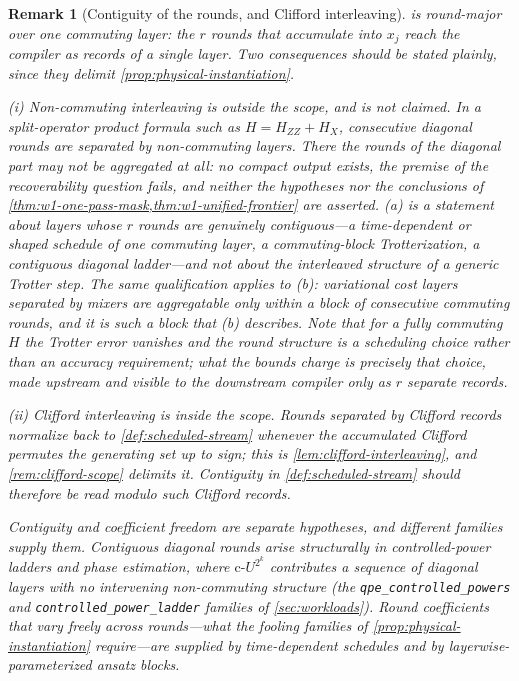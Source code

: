 \documentclass[aps,prx,reprint,floatfix,superscriptaddress]{revtex4-2}
\newtheorem{remark}{Remark}
\begin{document}
\begin{remark}[Contiguity of the rounds, and Clifford interleaving]
\label{rem:round-contiguity}
 is round-major over \emph{one} commuting
layer: the $r$ rounds that accumulate into $x_j$ reach the compiler as
records of a single layer.  Two consequences should be stated plainly,
since they delimit \cref{prop:physical-instantiation}.

(i) \emph{Non-commuting interleaving is outside the scope, and is not
claimed.}  In a split-operator product formula such as
$H=H_{ZZ}+H_X$, consecutive diagonal rounds are separated by
non-commuting layers.  There the rounds of the diagonal part may not be
aggregated at all: no compact output exists, the premise of the
recoverability question fails, and neither the hypotheses nor the
conclusions of \cref{thm:w1-one-pass-mask,thm:w1-unified-frontier}
are asserted.  (a) is a statement
about layers whose $r$ rounds are genuinely contiguous---a
time-dependent or shaped schedule of one commuting layer, a
commuting-block Trotterization, a contiguous diagonal ladder---and not
about the interleaved structure of a generic Trotter step.  The same
qualification applies to (b): variational cost layers separated by
mixers are aggregatable only within a block of consecutive commuting
rounds, and it is such a block that (b) describes.  Note that for a
\emph{fully} commuting $H$ the Trotter error vanishes and the round
structure is a scheduling choice rather than an accuracy requirement;
what the bounds charge is precisely that choice, made upstream and
visible to the downstream compiler only as $r$ separate records.

(ii) \emph{Clifford interleaving is inside the scope.}  Rounds separated
by Clifford records normalize back to \cref{def:scheduled-stream}
whenever the accumulated Clifford permutes the generating set up to
sign; this is \cref{lem:clifford-interleaving}, and
\cref{rem:clifford-scope} delimits it.  Contiguity in
\cref{def:scheduled-stream} should therefore be read modulo such
Clifford records.

Contiguity and coefficient freedom are separate hypotheses, and
different families supply them.  Contiguous diagonal rounds arise
structurally in controlled-power ladders and phase estimation, where
$\mathrm{c}\text{-}U^{2^k}$ contributes a sequence of diagonal layers with
no intervening non-commuting structure (the
\texttt{qpe\_controlled\_powers} and \texttt{controlled\_power\_ladder}
families of \cref{sec:workloads}).  Round coefficients that vary freely
across rounds---what the fooling families of
\cref{prop:physical-instantiation} require---are supplied by
time-dependent schedules and by layerwise-parameterized ansatz blocks.
\end{remark}
\end{document}
